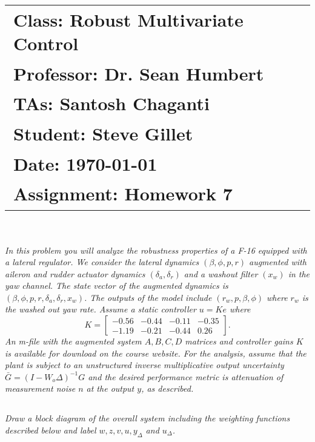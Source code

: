 \documentclass{article}
\begin{document}
\title{
    \begin{tabular}{@{}l@{}}
        \textbf{Class:} Robust Multivariate Control \\
        \textbf{Professor:} Dr. Sean Humbert \\
        \textbf{TAs:} Santosh Chaganti \\
        \textbf{Student:} Steve Gillet \\
        \textbf{Date:} \today \\
        \textbf{Assignment:} Homework 7
    \end{tabular}
}

\author{}
\date{}

\maketitle

\section{}
\textit{In this problem you will analyze the robustness properties of a F-16 equipped with a lateral regulator. We consider the lateral dynamics $(\beta, \phi, p, r)$ augmented with aileron and rudder actuator dynamics $\left(\delta_a, \delta_r\right)$ and a washout filter $\left(x_w\right)$ in the yaw channel. The state vector of the augmented dynamics is $\left(\beta, \phi, p, r, \delta_a, \delta_r, x_w\right)$. The outputs of the model include $\left(r_w, p, \beta, \phi\right)$ where $r_w$ is the washed out yaw rate. Assume a static controller $u = K e$ where
\[
K = \begin{bmatrix}
-0.56 & -0.44 & -0.11 & -0.35 \\
-1.19 & -0.21 & -0.44 & 0.26
\end{bmatrix}.
\]
An m-file with the augmented system $A, B, C, D$ matrices and controller gains $K$ is available for download on the course website. For the analysis, assume that the plant is subject to an unstructured inverse multiplicative output uncertainty $\bar{G} = (I - W_o \Delta)^{-1} G$ and the desired performance metric is attenuation of measurement noise $n$ at the output $y$, as described.}

\subsection{} 
\textit{Draw a block diagram of the overall system including the weighting functions described below and label $w, z, v, u, y_{\Delta}$ and $u_{\Delta}$.}
\end{document}
